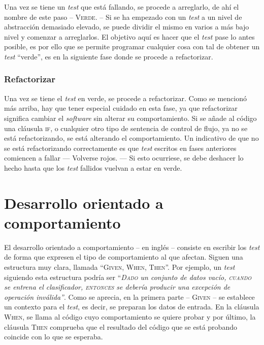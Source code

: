 Una vez se tiene un \emph{test} que está fallando, se procede a arreglarlo, de
ahí el nombre de este paso -- \textsc{Verde}. -- Si se ha empezado con un
\emph{test} a un nivel de abstracción demasiado elevado, se puede dividir el
mismo en varios a más bajo nivel y comenzar a arreglarlos. El objetivo aquí es
hacer que el \emph{test} pase lo antes posible, es por ello que se permite
programar cualquier cosa con tal de obtener un \emph{test} ``verde'', es en la
siguiente fase donde se procede a refactorizar.

\subsubsection{Refactorizar}
\label{sec:tddrefactor}

Una vez se tiene el \emph{test} en verde, se procede a refactorizar. Como se
mencionó más arriba, hay que tener especial cuidado en esta fase, ya que
refactorizar significa cambiar el \emph{software} sin alterar su
comportamiento. Si se añade al código una cláusula \textsc{if}, o cualquier otro
tipo de sentencia de control de flujo, ya no se está refactorizando, se está
alterando el comportamiento. Un indicativo de que no se está refactorizando
correctamente es que \emph{test} escritos en fases anteriores comiencen a fallar
--- Volverse rojos. --- Si esto ocurriese, se debe deshacer lo hecho hasta que
los \emph{test} fallidos vuelvan a estar en verde.

\section{Desarrollo orientado a comportamiento}
\label{sec:bdd}

El desarrollo orientado a comportamiento --  en inglés -- consiste en
escribir los \emph{test} de forma que expresen el tipo de comportamiento al que
afectan. Siguen una estructura muy clara, llamada ``\textsc{Given, When,
  Then}''. Por ejemplo, un \emph{test} siguiendo esta estructura podría ser
``\emph{\textsc{Dado} un conjunto de datos vacío, \textsc{cuando} se entrena el
  clasificador, \textsc{entonces} se debería producir una excepción de operación
  inválida''}. Como se aprecia, en la primera parte -- \textsc{Given} -- se
establece un contexto para el \emph{test}, es decir, se preparan los datos de
entrada.  En la cláusula \textsc{When}, se llama al código cuyo comportamiento
se quiere probar y por último, la cláusula \textsc{Then} comprueba que el
resultado del código que se está probando coincide con lo que se esperaba.

